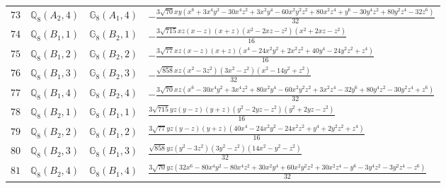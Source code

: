\documentclass[fleqn,8pt,landscape]{jsarticle}
\begin{document}
\begin{table}[ht!]
\begin{center}
\begin{tabular}{cccl}
$ 73 $ & $ \mathbb{Q}_{8}(A_{2},4) $ & $ \mathbb{G}_{8}(A_{1},4) $ & $ - \frac{3 \sqrt{70} x y \left(x^{6} + 3 x^{4} y^{2} - 30 x^{4} z^{2} + 3 x^{2} y^{4} - 60 x^{2} y^{2} z^{2} + 80 x^{2} z^{4} + y^{6} - 30 y^{4} z^{2} + 80 y^{2} z^{4} - 32 z^{6}\right)}{32} $ \\
$ 74 $ & $ \mathbb{Q}_{8}(B_{1},1) $ & $ \mathbb{G}_{8}(B_{2},1) $ & $ - \frac{3 \sqrt{715} x z \left(x - z\right) \left(x + z\right) \left(x^{2} - 2 x z - z^{2}\right) \left(x^{2} + 2 x z - z^{2}\right)}{16} $ \\
$ 75 $ & $ \mathbb{Q}_{8}(B_{1},2) $ & $ \mathbb{G}_{8}(B_{2},2) $ & $ - \frac{3 \sqrt{77} x z \left(x - z\right) \left(x + z\right) \left(x^{4} - 24 x^{2} y^{2} + 2 x^{2} z^{2} + 40 y^{4} - 24 y^{2} z^{2} + z^{4}\right)}{16} $ \\
$ 76 $ & $ \mathbb{Q}_{8}(B_{1},3) $ & $ \mathbb{G}_{8}(B_{2},3) $ & $ - \frac{\sqrt{858} x z \left(x^{2} - 3 z^{2}\right) \left(3 x^{2} - z^{2}\right) \left(x^{2} - 14 y^{2} + z^{2}\right)}{32} $ \\
$ 77 $ & $ \mathbb{Q}_{8}(B_{1},4) $ & $ \mathbb{G}_{8}(B_{2},4) $ & $ - \frac{3 \sqrt{70} x z \left(x^{6} - 30 x^{4} y^{2} + 3 x^{4} z^{2} + 80 x^{2} y^{4} - 60 x^{2} y^{2} z^{2} + 3 x^{2} z^{4} - 32 y^{6} + 80 y^{4} z^{2} - 30 y^{2} z^{4} + z^{6}\right)}{32} $ \\
$ 78 $ & $ \mathbb{Q}_{8}(B_{2},1) $ & $ \mathbb{G}_{8}(B_{1},1) $ & $ \frac{3 \sqrt{715} y z \left(y - z\right) \left(y + z\right) \left(y^{2} - 2 y z - z^{2}\right) \left(y^{2} + 2 y z - z^{2}\right)}{16} $ \\
$ 79 $ & $ \mathbb{Q}_{8}(B_{2},2) $ & $ \mathbb{G}_{8}(B_{1},2) $ & $ \frac{3 \sqrt{77} y z \left(y - z\right) \left(y + z\right) \left(40 x^{4} - 24 x^{2} y^{2} - 24 x^{2} z^{2} + y^{4} + 2 y^{2} z^{2} + z^{4}\right)}{16} $ \\
$ 80 $ & $ \mathbb{Q}_{8}(B_{2},3) $ & $ \mathbb{G}_{8}(B_{1},3) $ & $ \frac{\sqrt{858} y z \left(y^{2} - 3 z^{2}\right) \left(3 y^{2} - z^{2}\right) \left(14 x^{2} - y^{2} - z^{2}\right)}{32} $ \\
$ 81 $ & $ \mathbb{Q}_{8}(B_{2},4) $ & $ \mathbb{G}_{8}(B_{1},4) $ & $ \frac{3 \sqrt{70} y z \left(32 x^{6} - 80 x^{4} y^{2} - 80 x^{4} z^{2} + 30 x^{2} y^{4} + 60 x^{2} y^{2} z^{2} + 30 x^{2} z^{4} - y^{6} - 3 y^{4} z^{2} - 3 y^{2} z^{4} - z^{6}\right)}{32} $ \\
 \hline \hline
\end{tabular}
\end{center}
\end{table}
\end{document}
